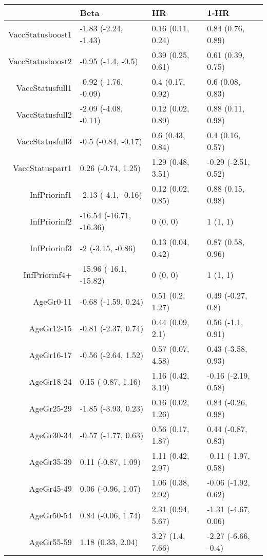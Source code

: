 \begin{table}[ht]
\centering
\begin{tabular}{rlll}
  \hline
 & Beta & HR & 1-HR \\ 
  \hline
VaccStatusboost1 & -1.83 (-2.24, -1.43) & 0.16 (0.11, 0.24) & 0.84 (0.76, 0.89) \\ 
  VaccStatusboost2 & -0.95 (-1.4, -0.5) & 0.39 (0.25, 0.61) & 0.61 (0.39, 0.75) \\ 
  VaccStatusfull1 & -0.92 (-1.76, -0.09) & 0.4 (0.17, 0.92) & 0.6 (0.08, 0.83) \\ 
  VaccStatusfull2 & -2.09 (-4.08, -0.11) & 0.12 (0.02, 0.89) & 0.88 (0.11, 0.98) \\ 
  VaccStatusfull3 & -0.5 (-0.84, -0.17) & 0.6 (0.43, 0.84) & 0.4 (0.16, 0.57) \\ 
  VaccStatuspart1 & 0.26 (-0.74, 1.25) & 1.29 (0.48, 3.51) & -0.29 (-2.51, 0.52) \\ 
  InfPriorinf1 & -2.13 (-4.1, -0.16) & 0.12 (0.02, 0.85) & 0.88 (0.15, 0.98) \\ 
  InfPriorinf2 & -16.54 (-16.71, -16.36) & 0 (0, 0) & 1 (1, 1) \\ 
  InfPriorinf3 & -2 (-3.15, -0.86) & 0.13 (0.04, 0.42) & 0.87 (0.58, 0.96) \\ 
  InfPriorinf4+ & -15.96 (-16.1, -15.82) & 0 (0, 0) & 1 (1, 1) \\ 
  AgeGr0-11 & -0.68 (-1.59, 0.24) & 0.51 (0.2, 1.27) & 0.49 (-0.27, 0.8) \\ 
  AgeGr12-15 & -0.81 (-2.37, 0.74) & 0.44 (0.09, 2.1) & 0.56 (-1.1, 0.91) \\ 
  AgeGr16-17 & -0.56 (-2.64, 1.52) & 0.57 (0.07, 4.58) & 0.43 (-3.58, 0.93) \\ 
  AgeGr18-24 & 0.15 (-0.87, 1.16) & 1.16 (0.42, 3.19) & -0.16 (-2.19, 0.58) \\ 
  AgeGr25-29 & -1.85 (-3.93, 0.23) & 0.16 (0.02, 1.26) & 0.84 (-0.26, 0.98) \\ 
  AgeGr30-34 & -0.57 (-1.77, 0.63) & 0.56 (0.17, 1.87) & 0.44 (-0.87, 0.83) \\ 
  AgeGr35-39 & 0.11 (-0.87, 1.09) & 1.11 (0.42, 2.97) & -0.11 (-1.97, 0.58) \\ 
  AgeGr45-49 & 0.06 (-0.96, 1.07) & 1.06 (0.38, 2.92) & -0.06 (-1.92, 0.62) \\ 
  AgeGr50-54 & 0.84 (-0.06, 1.74) & 2.31 (0.94, 5.67) & -1.31 (-4.67, 0.06) \\ 
  AgeGr55-59 & 1.18 (0.33, 2.04) & 3.27 (1.4, 7.66) & -2.27 (-6.66, -0.4) \\ 

\end{tabular}
\end{table}
